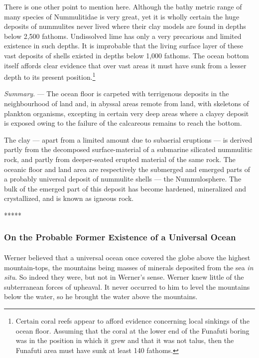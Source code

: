 \documentclass[a4paper, 12pt, oneside, landscape]{article}
\begin{document}
There is one other point to mention here. Although the bathy metric range of many species of Nummulitidae is very great, yet it is wholly certain the huge deposits of nummulites never lived where their clay models are found in depths below 2,500 fathoms. Undissolved lime has only a very precarious and limited existence in such depths. It is improbable that the living surface layer of these vast deposits of shells existed in depths below 1,000 fathoms. The ocean bottom itself affords clear evidence that over vast areas it must have sunk from a lesser depth to its present position.\footnote{Certain coral reefs appear to afford evidence concerning local sinkings of the ocean floor. Assuming that the coral at the lower end of the Funafuti boring was in the position in which it grew and that it was not talus, then the Funafuti area must have sunk at least 140 fathoms.} 

\emph{Summary}. --- The ocean floor is carpeted with terrigenous deposits in the neighbourhood of land and, in abyssal areas remote from land, with skeletons of plankton organisms, excepting in certain very deep areas where a clayey deposit is exposed owing to the failure of the calcareous remains to reach the bottom.

The clay --- apart from a limited amount due to subaerial eruptions --- is derived partly from the decomposed surface-material of a submarine silicated nummulitic rock, and partly from deeper-seated erupted material of the same rock. The oceanic floor and land area are respectively the submerged and emerged parts of a probably universal deposit of nummulite shells --- the Nummulosphere. The bulk of the emerged part of this deposit has become hardened, mineralized and crystallized, and is known as igneous rock.

\centerline{*\hspace{15mm}*\hspace{15mm}*\hspace{15mm}*\hspace{15mm}*}
\bigskip
\subsubsection{On the Probable Former Existence of a Universal Ocean}
\paragraph{}
Werner believed that a universal ocean once covered the globe above the highest mountain-tops, the mountains being masses of minerals deposited from the sea \emph{in situ}. So indeed they were, but not in Werner's sense. Werner knew little of the subterranean forces of upheaval. It never occurred to him to level the mountains below the water, so he brought the water above the mountains.
\end{document}
